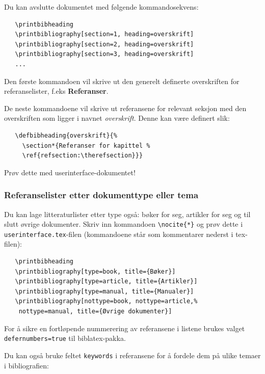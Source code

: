 \documentclass[11pt,norsk,a4paper]{article}
\begin{document}
Du kan avslutte dokumentet med følgende kommandosekvens:

{\footnotesize\begin{verbatim}
   \printbibheading
   \printbibliography[section=1, heading=overskrift]
   \printbibliography[section=2, heading=overskrift]
   \printbibliography[section=3, heading=overskrift]
   ...
\end{verbatim}}

Den første kommandoen vil skrive ut den generelt definerte
overskriften for referanselister, f.eks \textbf{Referanser}.

De neste kommandoene vil skrive ut referansene for relevant seksjon
med den overskriften som ligger i navnet \textit{overskrift}. Denne
kan være definert slik:\label{heading}

{\footnotesize\begin{verbatim}
   \defbibheading{overskrift}{%
     \section*{Referanser for kapittel %
     \ref{refsection:\therefsection}}}
\end{verbatim}}

\noindent{}Prøv dette med userinterface-dokumentet!

\subsubsection*{Referanselister etter dokumenttype eller tema}
Du kan lage litteraturlister etter type også: bøker for seg, artikler
for seg og til slutt øvrige dokumenter. Skriv inn kommandoen
\verb=\nocite{*}= og prøv dette i \texttt{userinterface.tex}-filen
(kommandoene står som kommentarer nederst i tex-filen):

{\footnotesize\begin{verbatim}
   \printbibheading
   \printbibliography[type=book, title={Bøker}]
   \printbibliography[type=article, title={Artikler}]
   \printbibliography[type=manual, title={Manualer}]
   \printbibliography[nottype=book, nottype=article,%
    nottype=manual, title={Øvrige dokumenter}]
\end{verbatim}}

For å sikre en fortløpende nummerering av referansene i listene brukes
valget \texttt{defernumbers=true} til biblatex-pakka.

Du kan også bruke feltet \verb=keywords= i referansene for å fordele dem på ulike temaer i bibliografien:
\end{document}

